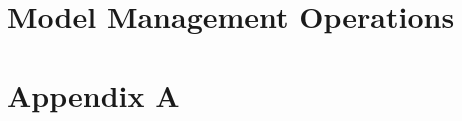 \documentclass[11pt,a4paper]{scrartcl}
\begin{document}
\section{Model Management Operations}

\pagebreak
\appendix
\section{Appendix A}
\end{document}
